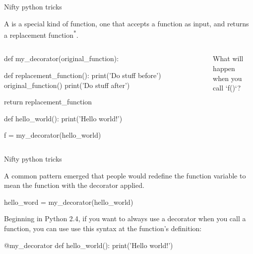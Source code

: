 \documentclass[aspectratio=149, handout] {beamer}
\begin{document}
\begin{frame}[fragile]{Nifty python tricks}

  A  is a special kind of function, 
  one that accepts a function as input, 
  and returns a replacement function\textsuperscript{*}.


  \medskip \pause

  \begin{columns}

    \begin{column}[b]{.65\textwidth}

      \begin{smallpythoncode}
      def my_decorator(original_function):
    
          def replacement_function():
              print('Do stuff before')
              original_function()
              print('Do stuff after')

          return replacement_function

      def hello_world():
          print('Hello world!')

      f = my_decorator(hello_world)

      \end{smallpythoncode}
      
    \end{column}
    \begin{column}[b]{.3\textwidth}

      What will happen\\when you call \inline`f()`?

      \vspace{1cm}

    \end{column}
  \end{columns}
\end{frame}


\begin{frame}[fragile]{Nifty python tricks}

  A common pattern emerged that people would redefine the function variable to mean the function with the decorator applied.
  \begin{pythoncode}
    hello_word = my_decorator(hello_world)
  \end{pythoncode}
  
  \pause \medskip
  
  Beginning in Python 2.4, if you want to {always} use a decorator when you call a function, you can use use this syntax 
  at the function's definition:
  \begin{pythoncode}
    @my_decorator
    def hello_world():
        print('Hello world!')
  \end{pythoncode}

\end{frame}
\end{document}
